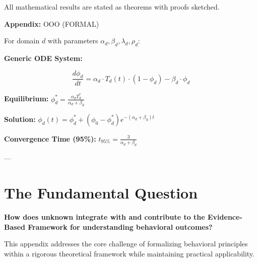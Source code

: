 All mathematical results are stated as theorems with proofs sketched.


\begin{tcolorbox}[colback=blue!5!white, colframe=blue!75!black, title=Quick Reference: System Summary]
\textbf{Appendix:} OOO (FORMAL)


For domain $d$ with parameters $\alpha_d, \beta_d, \lambda_d, \rho_d$:

\textbf{Generic ODE System:}

\begin{equation}
\frac{d\phi_d}{dt} = \alpha_d \cdot T_d(t) \cdot (1 - \phi_d) - \beta_d \cdot \phi_d
\end{equation}

\textbf{Equilibrium:} $\phi^*_d = \frac{\alpha_d T^*_d}{\alpha_d + \beta_d}$

\textbf{Solution:} $\phi_d(t) = \phi^*_d + (\phi_0 - \phi^*_d)e^{-(\alpha_d + \beta_d)t}$

\textbf{Convergence Time (95\%):} $t_{95\%} = \frac{3}{\alpha_d + \beta_d}$

\end{tcolorbox}

---


\section{The Fundamental Question}
\label{sec:ooo-fundamental}

\begin{tcolorbox}[
    colback=red!5!white,
    colframe=red!75!black,
    title={\textbf{Fundamental Question}}
]
\textbf{How does unknown integrate with and contribute to the
Evidence-Based Framework for understanding behavioral outcomes?}

This appendix addresses the core challenge of formalizing behavioral principles
within a rigorous theoretical framework while maintaining practical applicability.
\end{tcolorbox}


